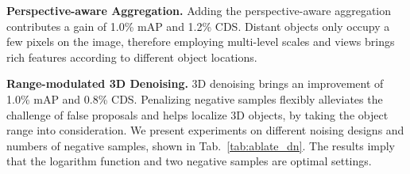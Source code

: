 \documentclass[letterpaper]{article} \usepackage{aaai24}
\begin{document}
\noindent\textbf{Perspective-aware Aggregation.} Adding the perspective-aware aggregation contributes a gain of 1.0\% mAP and 1.2\% CDS. Distant objects only occupy a few pixels on the image, therefore employing multi-level scales and views brings rich features according to different object locations. 


\begin{table}[t]
    \centering
    \caption{Performance Comparison of negative denoising samples with different designs and numbers.}
    \vspace{-0.2cm}
    \label{tab:ablate_dn}
    \tiny
    \vspace{-0.3cm}
\end{table} \noindent\textbf{Range-modulated 3D Denoising.} 3D denoising brings an improvement of 1.0\% mAP and 0.8\% CDS. Penalizing negative samples flexibly alleviates the challenge of false proposals and helps localize 3D objects, by taking the object range into consideration.  
We present experiments on different noising designs and numbers of negative samples, shown in Tab.~\ref{tab:ablate_dn}. The results imply that the logarithm function and two negative samples are optimal settings.
\end{document}
